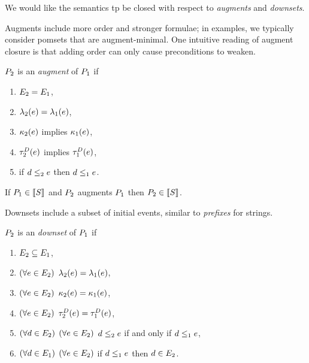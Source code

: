 We would like the semantics tp be closed with respect to \emph{augments} and
\emph{downsets}.

Augments include more order and stronger formulae; in examples, we typically
consider pomsets that are augment-minimal.  One intuitive reading of augment
closure is that adding order can only cause preconditions to weaken.
\begin{definition}
  \label{def:augment}
  $P_2$ is an \emph{augment} of $P_1$ if
  \begin{enumerate}
  \item $E_2=E_1$,
  \item $\lambda_2(e)=\lambda_1(e)$,
  \item $\kappa_2(e)$ implies $\kappa_1(e)$,
  \item $\aTr[2]{\bEvs}{\aEv}$ implies $\aTr[1]{\bEvs}{\aEv}$,
  \item if $d\le_2e$ then $d\le_1e$.
  \end{enumerate}
\end{definition}

\begin{proposition}
  If $P_1\in\llbracket S\rrbracket$ and $P_2$  augments $P_1$ then $P_2\in\llbracket S\rrbracket$.
\end{proposition}

Downsets include a subset of initial events, similar to \emph{prefixes} for
strings.
\begin{definition}
  \label{def:downset}
  $P_2$ is an \emph{downset} of $P_1$ if
  \begin{enumerate}
  \item $E_2\subseteq E_1$,
  \item $(\forall e\in E_2)$ $\lambda_2(e)=\lambda_1(e)$,
  \item $(\forall e\in E_2)$ $\kappa_2(e)=\kappa_1(e)$,
  \item $(\forall e\in E_2)$ $\aTr[2]{\bEvs}{\aEv}=\aTr[1]{\bEvs}{\aEv}$,
  \item $(\forall d\in E_2)$ $(\forall e\in E_2)$ $d\le_2e$ if and only if $d\le_1e$,
  \item $(\forall d\in E_1)$ $(\forall e\in E_2)$ if $d\le_1e$ then $d\in E_2$.
  \end{enumerate}
\end{definition}

